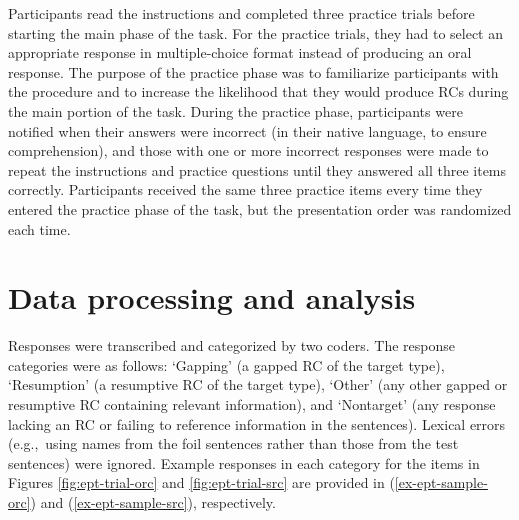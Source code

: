 Participants read the instructions and completed three practice trials before starting the main phase of the task. For the practice trials, they had to select an appropriate response in multiple-choice format instead of producing an oral response. The purpose of the practice phase was to familiarize participants with the procedure and to increase the likelihood that they would produce RCs during the main portion of the task. During the practice phase, participants were notified when their answers were incorrect (in their native language, to ensure comprehension), and those with one or more incorrect responses were made to repeat the instructions and practice questions until they answered all three items correctly. Participants received the same three practice items every time they entered the practice phase of the task, but the presentation order was randomized each time.

\section{Data processing and analysis}\label{ept-analysis}

Responses were transcribed and categorized by two coders. The response categories were as follows: `Gapping' (a gapped RC of the target type), `Resumption' (a resumptive RC of the target type), `Other' (any other gapped or resumptive RC containing relevant information), and `Nontarget' (any response lacking an RC or failing to reference information in the sentences). Lexical errors (e.g.,~using names from the foil sentences rather than those from the test sentences) were ignored. Example responses in each category for the items in Figures \ref{fig:ept-trial-orc} and \ref{fig:ept-trial-src} are provided in (\ref{ex-ept-sample-orc}) and (\ref{ex-ept-sample-src}), respectively. 

